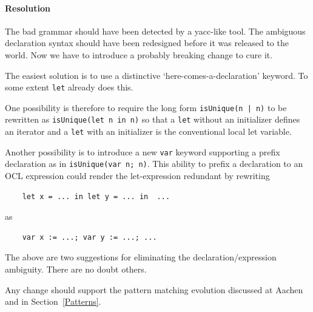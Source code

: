 \documentclass{jot}
\begin{document}
\paragraph{Resolution}
 
The bad grammar should have been detected by a yacc-like tool. The ambiguous declaration syntax should have been redesigned before it was released to the world. Now we have to introduce a probably breaking change to cure it. 

The easiest solution is to use a distinctive `here-comes-a-declaration' keyword. To some extent \verb$let$ already does this.

One possibility is therefore to require the long form \verb$isUnique(n | n)$ to be rewritten as \verb$isUnique(let n in n)$ so that a \verb$let$ without an initializer defines an iterator and a \verb$let$ with an initializer is the conventional local let variable.

Another possibility is to introduce a new \verb$var$ keyword supporting a prefix declaration as in \verb$isUnique(var n; n)$. This ability to prefix a declaration to an OCL expression could render the let-expression redundant by rewriting

\begin{verbatim}
    let x = ... in let y = ... in  ...
\end{verbatim}

as

\begin{verbatim}
    var x := ...; var y := ...; ...
\end{verbatim}

The above are two suggestions for eliminating the declaration/expression ambiguity. There are no doubt others.

Any change should support the pattern matching evolution discussed at Aachen \cite{OCL-Aachen} and in Section~\ref{Patterns}.




\end{document}
